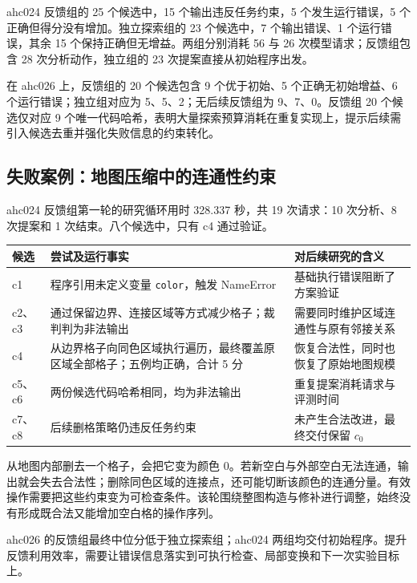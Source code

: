 
ahc024 反馈组的 25 个候选中，15 个输出违反任务约束，5 个发生运行错误，5 个正确但得分没有增加。独立探索组的 23 个候选中，7 个输出错误、1 个运行错误，其余 15 个保持正确但无增益。两组分别消耗 56 与 26 次模型请求；反馈组包含 28 次分析动作，独立组的 23 次提案直接从初始程序出发。

在 ahc026 上，反馈组的 20 个候选包含 9 个优于初始、5 个正确无初始增益、6 个运行错误；独立组对应为 5、5、2；无后续反馈组为 9、7、0。反馈组 20 个候选仅对应 9 个唯一代码哈希，表明大量探索预算消耗在重复实现上，提示后续需引入候选去重并强化失败信息的约束转化。

\subsection{失败案例：地图压缩中的连通性约束}
ahc024 反馈组第一轮的研究循环用时 328.337 秒，共 19 次请求：10 次分析、8 次提案和 1 次结束。八个候选中，只有 c4 通过验证。

\begin{smalltable}\renewcommand{\arraystretch}{1.12}%
\begin{tabularx}{\linewidth}{@{}lLL@{}}\toprule
候选 & 尝试及运行事实 & 对后续研究的含义\\\midrule
c1 & 程序引用未定义变量 \texttt{color}，触发 NameError & 基础执行错误阻断了方案验证\\
c2、c3 & 通过保留边界、连接区域等方式减少格子；裁判判为非法输出 & 需要同时维护区域连通性与原有邻接关系\\
c4 & 从边界格子向同色区域执行遍历，最终覆盖原区域全部格子；五例均正确，合计 5 分 & 恢复合法性，同时也恢复了原始地图规模\\
c5、c6 & 两份候选代码哈希相同，均为非法输出 & 重复提案消耗请求与评测时间\\
c7、c8 & 后续删格策略仍违反任务约束 & 未产生合法改进，最终交付保留 $c_0$\\\bottomrule
\end{tabularx}
\end{smalltable}

从地图内部删去一个格子，会把它变为颜色 0。若新空白与外部空白无法连通，输出就会失去合法性；删除同色区域的连接点，还可能切断该颜色的连通分量。有效操作需要把这些约束变为可检查条件。该轮围绕整图构造与修补进行调整，始终没有形成既合法又能增加空白格的操作序列。

ahc026 的反馈组最终中位分低于独立探索组；ahc024 两组均交付初始程序。提升反馈利用效率，需要让错误信息落实到可执行检查、局部变换和下一次实验目标上。
